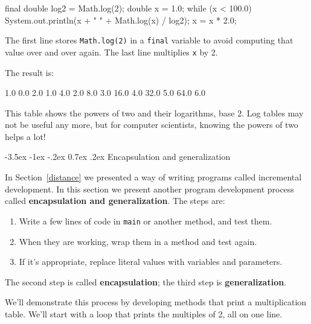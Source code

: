 \documentclass[12pt]{book}
\makeatletter
\theoremstyle{exercise}
\newcommand{\java}[1]{\verb"#1"}
\renewcommand{\section}{\@startsection{section}{1}{\z@}%
    {-3.5ex \@plus -1ex \@minus -.2ex}%
    {0.7ex \@plus.2ex}%
    {\normalfont\Large\bfseries}}
\newcommand{\java}[1]{\lstinline{#1}} %
\makeatother
\begin{document}
\begin{code}
    final double log2 = Math.log(2);
    double x = 1.0;
    while (x < 100.0) {
        System.out.println(x + "   " + Math.log(x) / log2);
        x = x * 2.0;
    }
\end{code}

The first line stores \java{Math.log(2)} in a \java{final} variable to avoid computing that value over and over again.
The last line multiplies \java{x} by 2.

The result is:

\begin{stdout}
1.0   0.0
2.0   1.0
4.0   2.0
8.0   3.0
16.0   4.0
32.0   5.0
64.0   6.0
\end{stdout}

This table shows the powers of two and their logarithms, base 2.
Log tables may not be useful any more, but for computer scientists, knowing the powers of two helps a lot!


\section{Encapsulation and generalization}
\label{encapsulation}


In Section~\ref{distance} we presented a way of writing programs called incremental development.
In this section we present another program development process called {\bf encapsulation and generalization}.
The steps are:

\begin{enumerate}

\item Write a few lines of code in \java{main} or another method,
and test them.

\item When they are working, wrap them in a method and test again.

\item If it's appropriate, replace literal values with variables and
parameters.

\end{enumerate}

The second step is called {\bf encapsulation}; the third step is {\bf generalization}.

We'll demonstrate this process by developing methods that print a multiplication table.
We'll start with a loop that prints the multiples of 2, all on one line.
\end{document}
